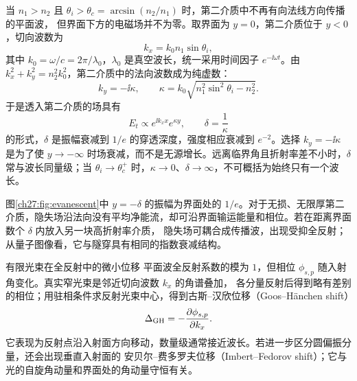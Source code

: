 当 $n_1>n_2$ 且 $\theta_i>\theta_c=\arcsin(n_2/n_1)$ 时，第二介质中不再有向法线方向传播的平面波，
但界面下方的电磁场并不为零。取界面为 $y=0$，第二介质位于 $y<0$，切向波数为
\[
 k_x=k_0n_1\sin\theta_i,
\]
其中 $k_0=\omega/c=2\pi/\lambda_0$，$\lambda_0$ 是真空波长，统一采用时间因子 $e^{-\ii\omega t}$。由 $k_x^2+k_y^2=n_2^2k_0^2$，第二介质中的法向波数成为纯虚数：
\begin{equation}
 k_y=-\ii\kappa,
 \qquad
 \kappa=k_0\sqrt{n_1^2\sin^2\theta_i-n_2^2}.
\end{equation}
于是透入第二介质的场具有
\begin{equation}
 E_t\propto e^{\ii k_xx}e^{\kappa y},
 \qquad
 \delta=\frac1\kappa
\end{equation}
的形式，$\delta$ 是振幅衰减到 $1/e$ 的穿透深度，强度相应衰减到 $e^{-2}$。选择 $k_y=-\ii\kappa$ 是为了使 $y\to-\infty$ 时场衰减，而不是无源增长。远离临界角且折射率差不小时，$\delta$ 常与波长同量级；当 $\theta_i\to\theta_c^+$ 时，$\kappa\to0$、$\delta\to\infty$，不可概括为始终只有一个波长。

\begin{center}
\end{center}

图\ref{ch27:fig:evanescent}中 $y=-\delta$ 的振幅为界面处的 $1/e$。对于无损、无限厚第二介质，隐失场沿法向没有平均净能流，却可沿界面输运能量和相位。若在距离界面数个 $\delta$ 内放入另一块高折射率介质，
隐失场可耦合成传播波，出现受抑全反射；从量子图像看，它与隧穿具有相同的指数衰减结构。

\begin{starread}{有限光束在全反射中的微小位移}
平面波全反射系数的模为 $1$，但相位 $\phi_{s,p}$ 随入射角变化。真实窄光束是邻近切向波数 $k_x$ 的角谱叠加，
各分量反射后得到略有差别的相位；用驻相条件求反射光束中心，得到古斯--汉欣位移（Goos--H\"anchen shift）
\[
 \Delta_{\rm GH}=-\frac{\partial\phi_{s,p}}{\partial k_x}.
\]
它表现为反射点沿入射面方向移动，数量级通常接近波长。若进一步区分圆偏振分量，还会出现垂直入射面的
安贝尔--费多罗夫位移（Imbert--Fedorov shift）；它与光的自旋角动量和界面处的角动量守恒有关。
\end{starread}

